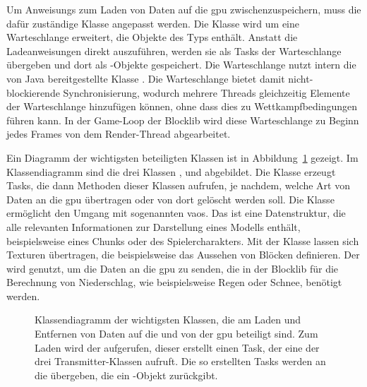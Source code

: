 Um \glspl{Anweisung} zum Laden von Daten auf die \ac{gpu} zwischenzuspeichern, muss die dafür zuständige Klasse \classLoader{} angepasst werden. Die Klasse wird um eine Warteschlange erweitert, die Objekte des Typs \classRunnable{} enthält. Anstatt die Ladeanweisungen direkt auszuführen, werden sie als Tasks der Warteschlange übergeben und dort als \classRunnable{}-Objekte gespeichert. Die Warteschlange nutzt intern die von Java bereitgestellte Klasse \classConcurrentLinkedQueue{}. Die Warteschlange bietet damit nicht-blockierende Synchronisierung, wodurch mehrere Threads gleichzeitig Elemente der Warteschlange hinzufügen können, ohne dass dies zu Wettkampfbedingungen führen kann. In der Game-Loop der Blocklib wird diese Warteschlange zu Beginn jedes Frames von dem Render-Thread abgearbeitet.

Ein Diagramm der wichtigsten beteiligten Klassen ist in Abbildung~\ref{fig:loaderDiagram} gezeigt. Im Klassendiagramm sind die drei Klassen \classVAOTransmitter{}, \classTextureTransmitter{} und \classDataTransmitter{} abgebildet. Die Klasse \classLoader{} erzeugt Tasks, die dann Methoden dieser Klassen aufrufen, je nachdem, welche Art von Daten an die \ac{gpu} übertragen oder von dort gelöscht werden soll. Die Klasse \classVAOTransmitter{} ermöglicht den Umgang mit sogenannten \acp{vao}. Das ist eine Datenstruktur, die alle relevanten Informationen zur Darstellung eines Modells enthält, beispielsweise eines Chunks oder des Spielercharakters. Mit der Klasse \classTextureTransmitter{} lassen sich Texturen übertragen, die beispielsweise das Aussehen von Blöcken definieren. Der \classDataTransmitter{} wird genutzt, um die Daten an die \ac{gpu} zu senden, die in der Blocklib für die Berechnung von Niederschlag, wie beispielsweise Regen oder Schnee, benötigt werden.

\begin{figure}[htbp]
	\centering
	
	\caption[Klassendiagramm der wichtigsten Klassen, die am Laden und Entfernen von Daten auf die und von der  beteiligt sind.]{Klassendiagramm der wichtigsten Klassen, die am Laden und Entfernen von Daten auf die und von der \ac{gpu} beteiligt sind. Zum Laden wird der \classLoader{} aufgerufen, dieser erstellt einen Task, der eine der drei Transmitter-Klassen aufruft. Die so erstellten Tasks werden an die \classDoubleBufferedAsyncQueue{} übergeben, die ein \classCompletableFuture{}-Objekt zurückgibt.}\label{fig:loaderDiagram}
\end{figure}

